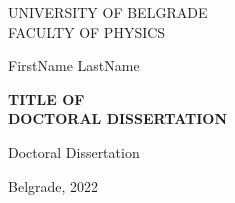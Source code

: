 \thispagestyle{empty}
\centering

\Large{
    UNIVERSITY OF BELGRADE \\
    FACULTY OF PHYSICS
}

\vspace{5.5cm}

\Large{
    FirstName LastName
}

\vspace{.5cm}


\textbf{\LARGE 
  {TITLE OF   \\ DOCTORAL DISSERTATION}
  }

\vspace{.5cm}

\Large{
    Doctoral Dissertation }

    \vspace{9.1cm}

\Large{
    Belgrade, 2022
}

\pagebreak
\justify

